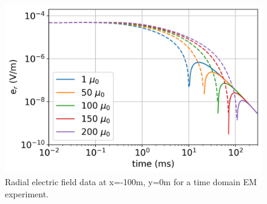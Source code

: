 \begin{figure}[H]
    \begin{center}
    \includegraphics[width=0.8\columnwidth]{figures/e-fields-tdem.png}
    \end{center}
\caption{
    Radial electric field data at x=-100m, y=0m for a time domain EM experiment.
}
\label{fig:e-fields-tdem}
\end{figure}



